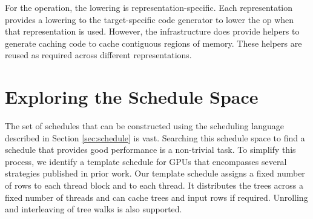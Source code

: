 For the  operation, the lowering is representation-specific. Each representation
provides a lowering to the target-specific code generator to lower the  op when
that representation is used. However, the \Treebeard{} infrastructure does provide helpers 
to generate caching code to cache contiguous regions of memory. These helpers are reused 
as required across different representations. 

\section{Exploring the Schedule Space}
\label{sec:exploring}


The set of schedules that can be constructed using the scheduling language described in 
Section \ref{sec:schedule} is vast. Searching this schedule space to find a schedule that
provides good performance is a non-trivial task. To simplify this process, we identify a
template schedule for GPUs that encompasses several strategies published in prior work.
Our template schedule assigns a fixed number of rows to each thread block and to each thread.
It distributes the trees across a fixed number of threads and can cache trees and 
input rows if required. Unrolling and interleaving of tree walks is also supported.


